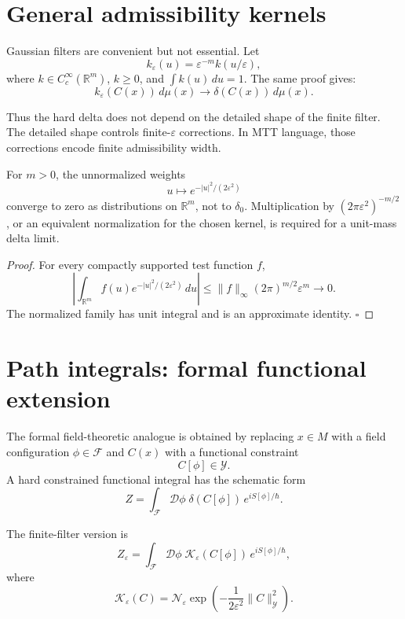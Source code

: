 \documentclass[11pt]{article}
\begin{document}
\section{General admissibility kernels}

Gaussian filters are convenient but not essential.  Let
\[
k_\varepsilon(u)=\varepsilon^{-m}k(u/\varepsilon),
\]
where \(k\in C_c^\infty(\mathbb R^m)\), \(k\ge0\), and \(\int k(u)\,du=1\).
The same proof gives:
\[
k_\varepsilon(C(x))\,d\mu(x)\to \delta(C(x))\,d\mu(x).
\]

Thus the hard delta does not depend on the detailed shape of the finite filter.  The detailed
shape controls finite-\(\varepsilon\) corrections.  In MTT language, those corrections encode
finite admissibility width.

\begin{proposition}
For \(m>0\), the unnormalized weights
\[
u\longmapsto e^{-|u|^2/(2\varepsilon^2)}
\]
converge to zero as distributions on \(\mathbb R^m\), not to
\(\delta_0\). Multiplication by \((2\pi\varepsilon^2)^{-m/2}\), or an
equivalent normalization for the chosen kernel, is required for a unit-mass delta limit.
\end{proposition}

\begin{proof}
For every compactly supported test function \(f\),
\[
\left|\int_{\mathbb R^m}f(u)e^{-|u|^2/(2\varepsilon^2)}\,du\right|
\le
\|f\|_\infty(2\pi)^{m/2}\varepsilon^m\longrightarrow0.
\]
The normalized family has unit integral and is an approximate identity. \(\square\)
\end{proof}

\section{Path integrals: formal functional extension}

The formal field-theoretic analogue is obtained by replacing \(x\in M\) with a field
configuration \(\phi\in\mathcal F\) and \(C(x)\) with a functional constraint
\[
C[\phi]\in \mathcal Y .
\]
A hard constrained functional integral has the schematic form
\[
Z=
\int_{\mathcal F}\mathcal D\phi\;
\delta(C[\phi])\,e^{iS[\phi]/\hbar}.
\]

The finite-filter version is
\[
Z_\varepsilon=
\int_{\mathcal F}\mathcal D\phi\;
\mathcal K_\varepsilon(C[\phi])\,e^{iS[\phi]/\hbar},
\]
where
\[
\mathcal K_\varepsilon(C)
=
\mathcal N_\varepsilon
\exp\!\left(-\frac{1}{2\varepsilon^2}\|C\|_{\mathcal Y}^{2}\right).
\]
\end{document}
